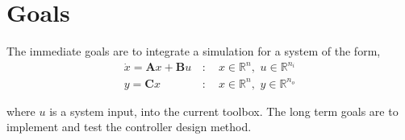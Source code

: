 \documentclass[11pt,a4paper]{article}
\begin{document}
\section*{Goals}
The immediate goals are to integrate a simulation for a system of the form,
\begin{equation*}
\begin{split}
 \dot{x} = \textbf{A}x + \textbf{B}u \,&: \quad x \in \mathbb{R}^{n},\,\, u \in \mathbb{R}^{n_i} \\
 y = \textbf{C}x\, &: \quad x \in \mathbb{R}^{n}, \,\, y \in \mathbb{R}^{n_o}
\end{split}
\end{equation*}
 

where $u$ is a system input, into the current toolbox. The long term goals are to implement and test the controller design method.



\end{document}
